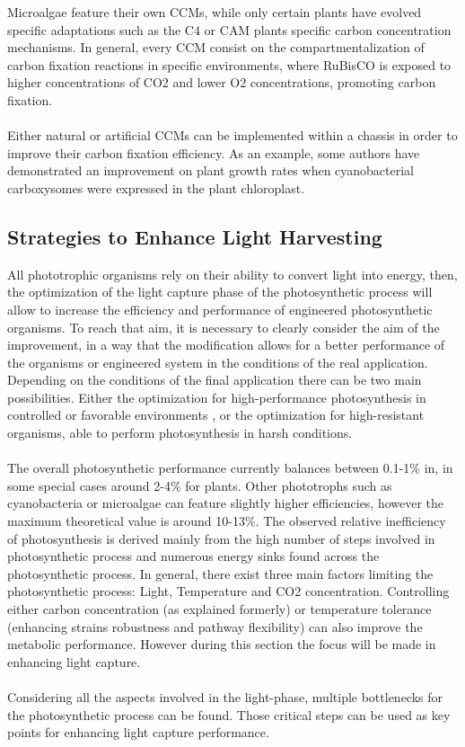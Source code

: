 \begin{itemize}
Microalgae feature their own CCMs, while only certain plants have evolved specific adaptations such as the C4 or CAM plants specific carbon concentration mechanisms. In general, every CCM consist on the compartmentalization of carbon fixation reactions in specific environments, where RuBisCO is exposed to higher concentrations of CO2 and lower O2 concentrations, promoting carbon fixation. \\ \\
Either natural or artificial CCMs can be implemented within a chassis in order to improve their carbon fixation efficiency. As an example, some authors have demonstrated an improvement on plant growth rates when cyanobacterial carboxysomes were expressed in the plant chloroplast.
\end{itemize}

\subsection{Strategies to Enhance Light Harvesting}
All phototrophic organisms rely on their ability to convert light into energy, then, the optimization of the light capture phase of the photosynthetic process will allow to increase the efficiency and performance of engineered photosynthetic organisms. To reach that aim, it is necessary to clearly consider the aim of the improvement, in a way that the modification allows for a better performance of the organisms or engineered system in the conditions of the real application. Depending on the conditions of the final application there can be two main possibilities. Either the optimization for high-performance photosynthesis in controlled or favorable environments , or the optimization for high-resistant organisms, able to perform photosynthesis in harsh conditions. \\ \\
The overall photosynthetic performance currently balances between 0.1-1\% in, in some special cases around 2-4\% for plants. Other phototrophs such as cyanobacteria or microalgae can feature slightly higher efficiencies, however the maximum theoretical value is around 10-13\%. The observed relative inefficiency of photosynthesis is derived mainly from the high number of steps involved in photosynthetic process and numerous energy sinks found across the photosynthetic process. In general, there exist three main factors limiting the photosynthetic process: Light, Temperature and CO2 concentration. Controlling either carbon concentration (as explained formerly) or temperature tolerance (enhancing strains robustness and pathway flexibility) can also improve the metabolic performance. However during this section the focus will be made in enhancing light capture.\\ \\
Considering all the aspects involved in the light-phase, multiple bottlenecks for the photosynthetic process can be found. Those critical steps can be used as key points for enhancing light capture performance.
 
